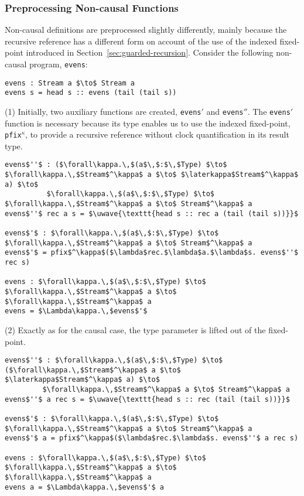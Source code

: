 \subsubsection{Preprocessing Non-causal Functions}
Non-causal definitions are preprocessed slightly differently, mainly because the
recursive reference has a different form on account of the use of the indexed
fixed-point introduced in Section~\ref{sec:guarded-recursion}. Consider the
following non-causal program, \texttt{evens}:
\begin{lstlisting}[mathescape]
evens : Stream a $\to$ Stream a
evens s = head s :: evens (tail (tail s))
\end{lstlisting}
(1) Initially, two auxiliary functions are created, \texttt{evens$'$} and
\texttt{evens$''$}. The \texttt{evens$'$} function is necessary because its type
enables us to use the indexed fixed-point, \texttt{pfix$^\kappa$}, to provide a recursive reference
without clock quantification in its result type.
\begin{lstlisting}[mathescape]
evens$''$ : ($\forall\kappa.\,$(a$\,$:$\,$Type) $\to$ $\forall\kappa.\,$Stream$^\kappa$ a $\to$ $\laterkappa$Stream$^\kappa$ a) $\to$ 
          $\forall\kappa.\,$(a$\,$:$\,$Type) $\to$ $\forall\kappa.\,$Stream$^\kappa$ a $\to$ Stream$^\kappa$ a
evens$''$ rec a s = $\uwave{\texttt{head s :: rec a (tail (tail s))}}$

evens$'$ : $\forall\kappa.\,$(a$\,$:$\,$Type) $\to$ $\forall\kappa.\,$Stream$^\kappa$ a $\to$ Stream$^\kappa$ a
evens$'$ = pfix$^\kappa$($\lambda$rec.$\lambda$a.$\lambda$s. evens$''$ rec s)

evens : $\forall\kappa.\,$(a$\,$:$\,$Type) $\to$ $\forall\kappa.\,$Stream$^\kappa$ a $\to$ $\forall\kappa.\,$Stream$^\kappa$ a
evens = $\Lambda\kappa.\,$evens$'$
\end{lstlisting}
(2) Exactly as for the causal case, the type parameter is lifted out of the fixed-point.
\begin{lstlisting}[mathescape]
evens$''$ : $\forall\kappa.\,$(a$\,$:$\,$Type) $\to$ ($\forall\kappa.\,$Stream$^\kappa$ a $\to$ $\laterkappa$Stream$^\kappa$ a) $\to$ 
         $\forall\kappa.\,$Stream$^\kappa$ a $\to$ Stream$^\kappa$ a
evens$''$ a rec s = $\uwave{\texttt{head s :: rec (tail (tail s))}}$

evens$'$ : $\forall\kappa.\,$(a$\,$:$\,$Type) $\to$ $\forall\kappa.\,$Stream$^\kappa$ a $\to$ Stream$^\kappa$ a
evens$'$ a = pfix$^\kappa$($\lambda$rec.$\lambda$s. evens$''$ a rec s)

evens : $\forall\kappa.\,$(a$\,$:$\,$Type) $\to$ $\forall\kappa.\,$Stream$^\kappa$ a $\to$ $\forall\kappa.\,$Stream$^\kappa$ a
evens a = $\Lambda\kappa.\,$evens$'$ a
\end{lstlisting}
